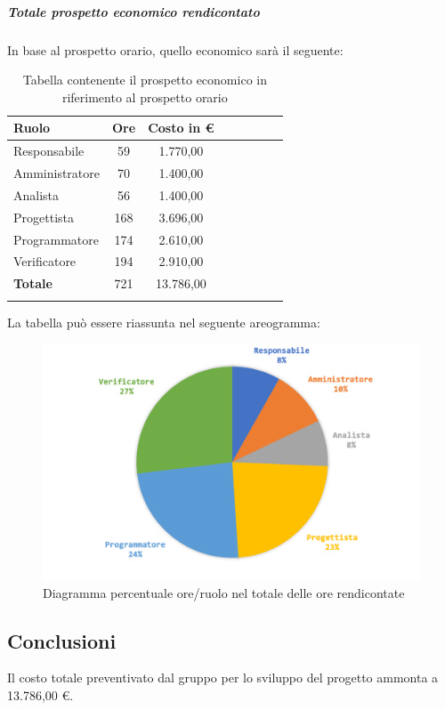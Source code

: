 				\subparagraph{Totale prospetto economico rendicontato}
				In base al prospetto orario, quello economico sarà il seguente: 
				
				\begin{longtable}{|l|c|c|c|c|c|c|c|}
					\hline
					\rowcolor{lighter-grayer}
					\textbf{Ruolo} & \textbf{Ore} & \textbf{Costo in €} \\
					\hline
					\endfirsthead
					
					\hline
					Responsabile 	    & 59 & 1.770,00\\
					\hline 
					\hline
					Amministratore	  & 70 & 1.400,00\\
					\hline
					\hline
					Analista 				& 56 & 1.400,00\\
					\hline
					\hline
					Progettista 		  & 168 & 3.696,00\\
					\hline
					\hline
					Programmatore 	 & 174 & 2.610,00\\
					\hline
					\hline
					Verificatore 		  & 194 & 2.910,00\\
					\hline
					\textbf{Totale} 	& 721 & 13.786,00\\
					\hline
					\caption{Tabella contenente il prospetto economico in riferimento al prospetto orario}
				\end{longtable}

				
				La tabella può essere riassunta nel seguente areogramma:
				\begin{figure}[H]
					\centering
					\includegraphics[width=0.8\linewidth]{./images/preventivo/totOreRed2.png}
					\caption{Diagramma percentuale ore/ruolo nel totale delle ore rendicontate}
					\label{fig:diagramma costi ruolo fase totale ore rendicontate}
				\end{figure}
				
			
			\subsection{Conclusioni}
				Il costo totale preventivato dal gruppo per lo sviluppo del progetto ammonta a 13.786,00 €.
				
				
		
	
	